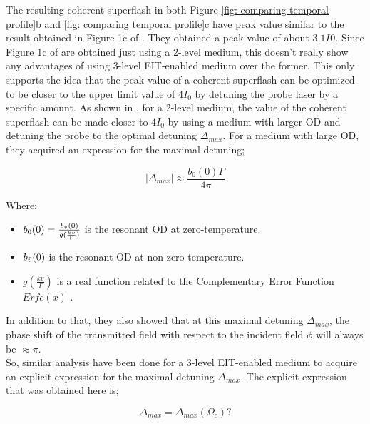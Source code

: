 The resulting coherent superflash in both Figure \ref{fig: comparing temporal profile}b and \ref{fig: comparing temporal profile}c have peak value similar to the result obtained in Figure 1c of \cite{Kwong2014}. They obtained a peak value of about $3.1 I_{}0$. Since Figure 1c of \cite{Kwong2014} are obtained just using a 2-level medium, this doesn't really show any advantages of using 3-level EIT-enabled medium over the former. This only supports the idea that the peak value of a coherent superflash can be optimized to be closer to the upper limit value of $4I_{0}$ by detuning the probe laser by a specific amount. As shown in \cite{Kwong2014}, for a 2-level medium, the value of the coherent superflash can be made closer to $4I_{0}$ by using a medium with larger OD and detuning the probe to the optimal detuning $\Delta_{max}$. For a medium with large OD, they acquired an expression for the maximal detuning;

\begin{equation}
    |\Delta_{max}| \approx \frac{b_{0}(0) \Gamma}{4\pi} 
\end{equation}

Where;

\begin{itemize}
    \item $b_{0}(0) = \frac{b_{\Bar{v}}(0)}{g(\frac{kv}{\Gamma})}$ is the resonant OD at zero-temperature. 
    \item $b_{\Bar{v}}(0)$ is the resonant OD at non-zero temperature.
    \item $g(\frac{kv}{\Gamma})$ is a real function related to the Complementary Error Function $Erfc(x)$ \cite{abramowitz1965ia}.
\end{itemize}

In addition to that, they also showed that at this maximal detuning $\Delta_{max}$, the phase shift of the transmitted field with respect to the incident field $\phi$ will always be $\approx \pi$.\\

So, similar analysis have been done for a 3-level EIT-enabled medium to acquire an explicit expression for the maximal detuning $\Delta_{max}$. The explicit expression that was obtained here is;

\begin{equation}
    \Delta_{max} = \Delta_{max}(\Omega_{c}) ?
\end{equation}


